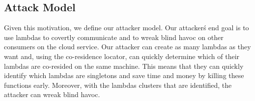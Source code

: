 \subsection{Attack Model}

Given this motivation, we define our attacker model. Our attacker\'s end goal is
to use lambdas to covertly communicate and to wreak blind havoc on other
consumers on the cloud service. Our attacker can create as many lambdas as they
want and, using the co-residence locator, can quickly determine which of their
lambdas are co-resided on the same machine. This means that they can quickly
identify which lambdas are singletons and save time and money by killing these
functions early. Moreover, with the lambdas clusters that are identified, the
attacker can wreak blind havoc.
